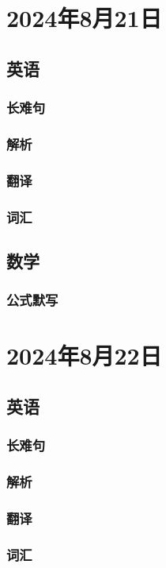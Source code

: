 \documentclass[UTF8]{ctexart}
\begin{document}
\section{2024年8月21日}
\subsection{英语}
\subsubsection{长难句}
\subsubsection{解析}
\subsubsection{翻译}
\subsubsection{词汇}
\subsection{数学}
\subsubsection{公式默写}
\begin{multicols}{2}
\end{multicols}
\section{2024年8月22日}
\subsection{英语}
\subsubsection{长难句}
\subsubsection{解析}
\subsubsection{翻译}
\subsubsection{词汇}
\end{document}
